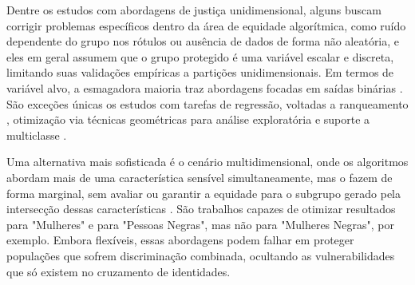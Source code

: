 Dentre os estudos com abordagens de justiça unidimensional, alguns buscam corrigir problemas específicos dentro da área de equidade algorítmica, como ruído dependente do grupo nos rótulos ou ausência de dados de forma não aleatória, e eles em geral assumem que o grupo protegido é uma variável escalar e discreta, limitando suas validações empíricas a partições unidimensionais. Em termos de variável alvo, a esmagadora maioria traz abordagens focadas em saídas binárias \cite{abernethy2020active,almuzaini2022abcinml,rolf2020balancing,yazdani2024fair,pang2024fairness,jeong2022fairness,jang2022group,shui2022learning,delaney2024oxonfair,hsu2022pushing,wang2022understanding}. São exceções únicas os estudos com tarefas de regressão, voltadas a ranqueamento \cite{dinh2024learning}, otimização via técnicas geométricas para análise exploratória \cite{zhou2023fair} e suporte a multiclasse \cite{cho2020fair}.

Uma alternativa mais sofisticada é o cenário multidimensional, onde os algoritmos abordam mais de uma característica sensível simultaneamente, mas o fazem de forma marginal, sem avaliar ou garantir a equidade para o subgrupo gerado pela intersecção dessas características \cite{geden2021fair,buyl2022optimal}. São trabalhos capazes de otimizar resultados para "Mulheres" e para "Pessoas Negras", mas não para "Mulheres Negras", por exemplo. Embora flexíveis, essas abordagens podem falhar em proteger populações que sofrem discriminação combinada, ocultando as vulnerabilidades que só existem no cruzamento de identidades.

